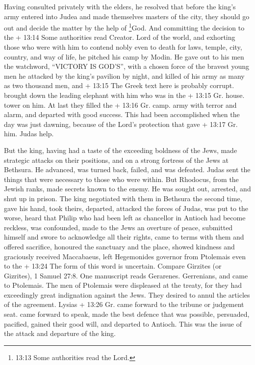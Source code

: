 Having consulted privately with the elders, he resolved
that before the king's army entered into Judea and made themselves
masters of the city, they should go out and decide the matter by the
help of \footnote{13:13 Some authorities read the Lord.}God.
 And committing the decision to the + 13:14 Some
authorities read Creator. Lord of the world, and exhorting those who
were with him to contend nobly even to death for laws, temple, city,
country, and way of life, he pitched his camp by Modin.  He
gave out to his men the watchword, ``VICTORY IS GOD'S'', with a chosen
force of the bravest young men he attacked by the king's pavilion by
night, and killed of his army as many as two thousand men, and + 13:15
The Greek text here is probably corrupt. brought down the leading
elephant with him who was in the + 13:15 Gr. house. tower on him.
 At last they filled the + 13:16 Gr. camp. army with terror
and alarm, and departed with good success.  This had been
accomplished when the day was just dawning, because of the Lord's
protection that gave + 13:17 Gr. him. Judas help.

 But the king, having had a taste of the exceeding boldness
of the Jews, made strategic attacks on their positions, 
and on a strong fortress of the Jews at Bethsura. He advanced, was
turned back, failed, and was defeated.  Judas sent the
things that were necessary to those who were within.  But
Rhodocus, from the Jewish ranks, made secrets known to the enemy. He was
sought out, arrested, and shut up in prison.  The king
negotiated with them in Bethsura the second time, gave his hand, took
theirs, departed, attacked the forces of Judas, was put to the worse,
 heard that Philip who had been left as chancellor in
Antioch had become reckless, was confounded, made to the Jews an
overture of peace, submitted himself and swore to acknowledge all their
rights, came to terms with them and offered sacrifice, honoured the
sanctuary and the place,  showed kindness and graciously
received Maccabaeus, left Hegemonides governor from Ptolemais even to
the + 13:24 The form of this word is uncertain. Compare Girzites (or
Gizrites), 1 Samuel 27:8. One manuscript reads Gerarenes. Gerrenians,
 and came to Ptolemais. The men of Ptolemais were
displeased at the treaty, for they had exceedingly great indignation
against the Jews. They desired to annul the articles of the agreement.
 Lysias + 13:26 Gr. came forward to the tribune or
judgement seat. came forward to speak, made the best defence that was
possible, persuaded, pacified, gained their good will, and departed to
Antioch. This was the issue of the attack and departure of the king.

